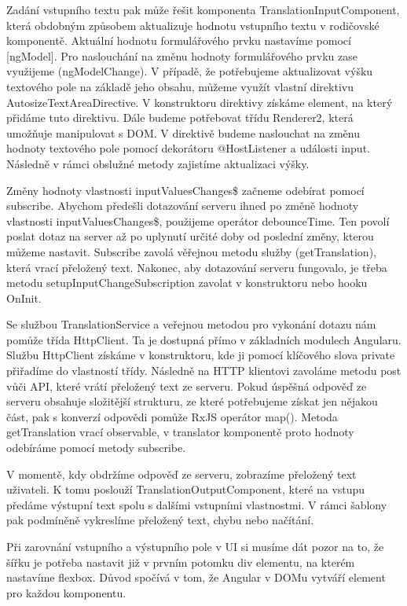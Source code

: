 Zadání vstupního textu pak může řešit komponenta TranslationInputComponent, která obdobným způsobem aktualizuje hodnotu vstupního textu v rodičovské komponentě. 
Aktuální hodnotu formulářového prvku nastavíme pomocí [ngModel]. Pro naslouchání na změnu hodnoty formulářového prvku zase využijeme (ngModelChange). 
V případě, že potřebujeme aktualizovat výšku textového pole na základě jeho obsahu, můžeme využít vlastní direktivu AutosizeTextAreaDirective. 
V konstruktoru direktivy získáme element, na který přidáme tuto direktivu. Dále budeme potřebovat třídu Renderer2, která umožňuje manipulovat s DOM. 
V direktivě budeme naslouchat na změnu hodnoty textového pole pomocí dekorátoru @HostListener a události input. Následně v rámci obslužné metody zajistíme aktualizaci výšky.
 
Změny hodnoty vlastnosti inputValuesChanges\$ začneme odebírat pomocí subscribe. 
Abychom předešli dotazování serveru ihned po změně hodnoty vlastnosti inputValuesChanges\$, použijeme operátor debounceTime. 
Ten povolí poslat dotaz na server až po uplynutí určité doby od poslední změny, kterou můžeme nastavit. 
Subscribe zavolá věřejnou metodu služby (getTranslation), která vrací přeložený text. 
Nakonec, aby dotazování serveru fungovalo, je třeba metodu setupInputChangeSubscription zavolat v konstruktoru nebo hooku OnInit.

Se službou TranslationService a veřejnou metodou pro vykonání dotazu nám pomůže třída HttpClient. Ta je dostupná přímo v základních modulech Angularu.
Službu HttpClient získáme v konstruktoru, kde ji pomocí klíčového slova private přiřadíme do vlastností třídy. 
Následně na HTTP klientovi zavoláme metodu post vůči API, které vrátí přeložený text ze serveru. 
Pokud úspěšná odpověď ze serveru obsahuje složitější strukturu, ze které potřebujeme získat jen nějakou část, pak s konverzí odpovědi pomůže RxJS operátor map(). 
Metoda getTranslation vrací observable, v translator komponentě proto hodnoty odebíráme pomocí metody subscribe. 

V momentě, kdy obdržíme odpověď ze serveru, zobrazíme přeložený text uživateli. 
K tomu poslouží TranslationOutputComponent, které na vstupu předáme výstupní text spolu s dalšími vstupními vlastnostmi. 
V rámci šablony pak podmíněně vykreslíme přeložený text, chybu nebo načítání. 

Při zarovnání vstupního a výstupního pole v UI si musíme dát pozor na to, že šířku je potřeba nastavit již v prvním potomku div elementu, na kterém nastavíme flexbox. 
Důvod spočívá v tom, že Angular v DOMu vytváří element pro každou komponentu.

